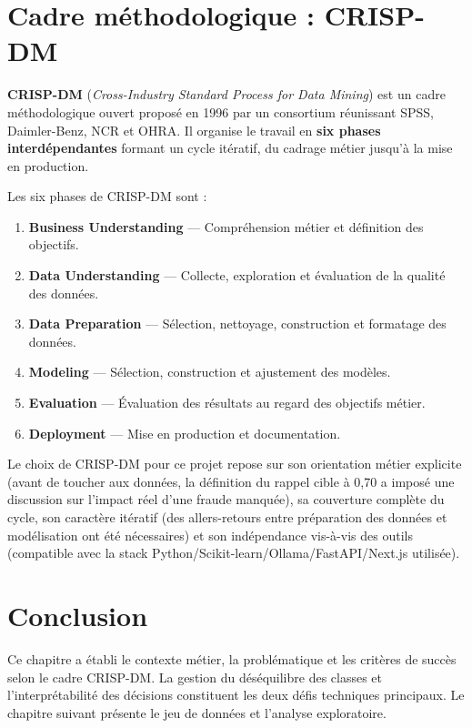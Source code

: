 \documentclass[12pt,a4paper,twoside]{report}
\begin{document}
\section{Cadre méthodologique : CRISP-DM}

\begin{definitionbox}
\textbf{CRISP-DM} (\textit{Cross-Industry Standard Process for Data Mining}) est un cadre méthodologique ouvert proposé en 1996 par un consortium réunissant SPSS, Daimler-Benz, NCR et OHRA. Il organise le travail en \textbf{six phases interdépendantes} formant un cycle itératif, du cadrage métier jusqu'à la mise en production.
\end{definitionbox}

Les six phases de CRISP-DM sont :

\begin{enumerate}
  \item \textbf{Business Understanding} --- Compréhension métier et définition des objectifs.
  \item \textbf{Data Understanding} --- Collecte, exploration et évaluation de la qualité des données.
  \item \textbf{Data Preparation} --- Sélection, nettoyage, construction et formatage des données.
  \item \textbf{Modeling} --- Sélection, construction et ajustement des modèles.
  \item \textbf{Evaluation} --- Évaluation des résultats au regard des objectifs métier.
  \item \textbf{Deployment} --- Mise en production et documentation.
\end{enumerate}

Le choix de CRISP-DM pour ce projet repose sur son orientation métier explicite (avant de toucher aux données, la définition du rappel cible à 0,70 a imposé une discussion sur l'impact réel d'une fraude manquée), sa couverture complète du cycle, son caractère itératif (des allers-retours entre préparation des données et modélisation ont été nécessaires) et son indépendance vis-à-vis des outils (compatible avec la stack Python/Scikit-learn/Ollama/FastAPI/Next.js utilisée).

\section*{Conclusion}

Ce chapitre a établi le contexte métier, la problématique et les critères de succès selon le cadre CRISP-DM. La gestion du déséquilibre des classes et l'interprétabilité des décisions constituent les deux défis techniques principaux. Le chapitre suivant présente le jeu de données et l'analyse exploratoire.
\end{document}
